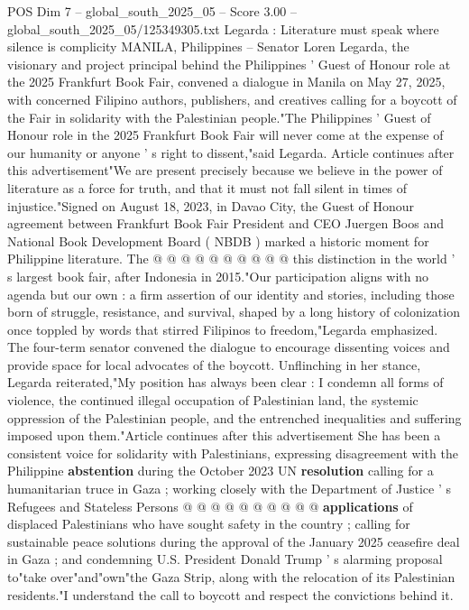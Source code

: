 \begin{textsample}{POS Dim 7 – global\_south\_2025\_05 – Score 3.00 – global\_south\_2025\_05/125349305.txt}  \label{ex:f7_pos_230}
Legarda : Literature must speak where silence is complicity MANILA, Philippines -- Senator Loren Legarda, the visionary and project principal behind the Philippines ' Guest of Honour role at the 2025 Frankfurt Book Fair, convened a dialogue in Manila on May 27, 2025, with concerned Filipino authors, publishers, and creatives calling for a boycott of the Fair in solidarity with the Palestinian people."The Philippines ' Guest of Honour role in the 2025 Frankfurt Book Fair will never come at the expense of our humanity or anyone ' s right to dissent,"said Legarda.
Article continues after this advertisement"We are present precisely because we believe in the power of literature as a force for truth, and that it must not fall silent in times of injustice."Signed on August 18, 2023, in Davao City, the Guest of Honour agreement between Frankfurt Book Fair President and CEO Juergen Boos and National Book Development Board ( NBDB ) marked a historic moment for Philippine literature.
The @ @ @ @ @ @ @ @ @ @ this distinction in the world ' s largest book fair, after Indonesia in 2015."Our participation aligns with no agenda but our own : a firm assertion of our identity and stories, including those born of struggle, resistance, and survival, shaped by a long history of colonization once toppled by words that stirred Filipinos to freedom,"Legarda emphasized.
The four-term senator convened the dialogue to encourage dissenting voices and provide space for local advocates of the boycott.
Unflinching in her stance, Legarda reiterated,"My position has always been clear : I condemn all forms of violence, the continued illegal occupation of Palestinian land, the systemic oppression of the Palestinian people, and the entrenched inequalities and suffering imposed upon them."Article continues after this advertisement She has been a consistent voice for solidarity with Palestinians, expressing disagreement with the Philippine \textbf{abstention} during the October 2023 UN \textbf{resolution} calling for a humanitarian truce in Gaza ; working closely with the Department of Justice ' s Refugees and Stateless Persons @ @ @ @ @ @ @ @ @ @ \textbf{applications} of displaced Palestinians who have sought safety in the country ; calling for sustainable peace solutions during the approval of the January 2025 ceasefire deal in Gaza ; and condemning U.S.
President Donald Trump ' s alarming proposal to"take over"and"own"the Gaza Strip, along with the relocation of its Palestinian residents."I understand the call to boycott and respect the convictions behind it.

\end{textsample}
